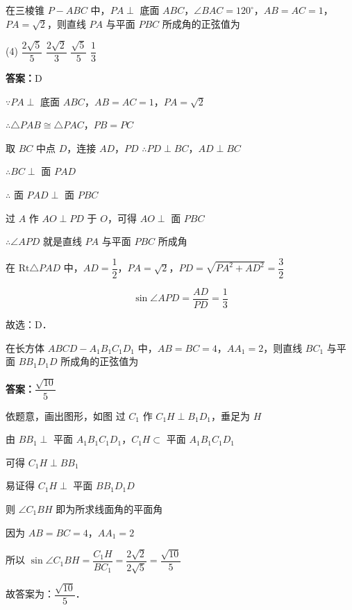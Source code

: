 \vspace{2em}

\begin{example}[\bkstar{3}{5}]
在三棱锥 $P-ABC$ 中，$PA\perp$ 底面 $ABC$，$\angle BAC=120^{\circ}$，$AB=AC=1$，$PA=\sqrt{2}$，则直线 $PA$ 与平面 $PBC$ 所成角的正弦值为
\begin{tasks}(4)
    \task $\dfrac{2\sqrt{5}}{5}$
    \task $\dfrac{2\sqrt{2}}{3}$
    \task $\dfrac{\sqrt{5}}{5}$
    \task $\dfrac{1}{3}$
\end{tasks}
\end{example}
\begin{solution}
\textbf{答案：}D

$\because PA\perp$ 底面 $ABC$，$AB=AC=1$，$PA=\sqrt{2}$

$\therefore \triangle PAB\cong\triangle PAC$，$PB=PC$

取 $BC$ 中点 $D$，连接 $AD$，$PD$
$\therefore PD\perp BC$，$AD\perp BC$

$\therefore BC\perp$ 面 $PAD$

$\therefore$ 面 $PAD\perp$ 面 $PBC$

过 $A$ 作 $AO\perp PD$ 于 $O$，可得 $AO\perp$ 面 $PBC$

$\therefore \angle APD$ 就是直线 $PA$ 与平面 $PBC$ 所成角

在 $\mathrm{Rt}\triangle PAD$ 中，$AD=\dfrac{1}{2}$，$PA=\sqrt{2}$，$PD=\sqrt{PA^2+AD^2}=\dfrac{3}{2}$

$$
\sin\angle APD=\dfrac{AD}{PD}=\dfrac{1}{3}
$$

故选：D．
\end{solution}

\vspace{2em}

\begin{example}[\bkstar{3}{5}]
在长方体 $ABCD-A_1B_1C_1D_1$ 中，$AB=BC=4$，$AA_1=2$，则直线 $BC_1$ 与平面 $BB_1D_1D$ 所成角的正弦值为
\end{example}
\begin{solution}
\textbf{答案：}$\dfrac{\sqrt{10}}{5}$

依题意，画出图形，如图
过 $C_1$ 作 $C_1H\perp B_1D_1$，垂足为 $H$

由 $BB_1\perp$ 平面 $A_1B_1C_1D_1$，$C_1H\subset$ 平面 $A_1B_1C_1D_1$

可得 $C_1H\perp BB_1$

易证得 $C_1H\perp$ 平面 $BB_1D_1D$

则 $\angle C_1BH$ 即为所求线面角的平面角

因为 $AB=BC=4$，$AA_1=2$

所以 $\sin\angle C_1BH=\dfrac{C_1H}{BC_1}=\dfrac{2\sqrt{2}}{2\sqrt{5}}=\dfrac{\sqrt{10}}{5}$

故答案为：$\dfrac{\sqrt{10}}{5}$．
\end{solution}

